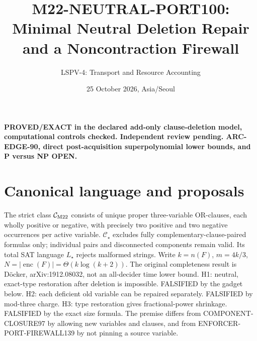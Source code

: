 \documentclass[11pt]{article}
\title{M22-NEUTRAL-PORT100: Minimal Neutral Deletion Repair and a Noncontraction Firewall}
\author{LSPV-4: Transport and Resource Accounting}
\date{25 October 2026, Asia/Seoul}
\begin{document}
\maketitle
\noindent\textbf{PROVED/EXACT in the declared add-only clause-deletion model, computational controls checked. Independent review pending. ARC-EDGE-90, direct post-acquisition superpolynomial lower bounds, and P versus NP OPEN.}
\section{Canonical language and proposals}
The strict class $\mathcal C_{\rm M22}$ consists of unique proper three-variable OR-clauses, each wholly positive or negative, with precisely two positive and two negative occurrences per active variable. $\mathcal C_\star$ excludes fully complementary-clause-paired formulas only; individual pairs and disconnected components remain valid. Its total SAT language $L_\star$ rejects malformed strings. Write $k=n(F)$, $m=4k/3$, $N=|\operatorname{enc}(F)|=\Theta(k\log(k+2))$. The original completeness result is D\"ocker, arXiv:1912.08032, not an all-decider time lower bound.
H1: neutral, exact-type restoration after deletion is impossible. FALSIFIED by the gadget below. H2: each deficient old variable can be repaired separately. FALSIFIED by mod-three charge. H3: type restoration gives fractional-power shrinkage. FALSIFIED by the exact size formula. The premise differs from COMPONENT-CLOSURE97 by allowing new variables and clauses, and from ENFORCER-PORT-FIREWALL139 by not pinning a source variable.
\end{document}
